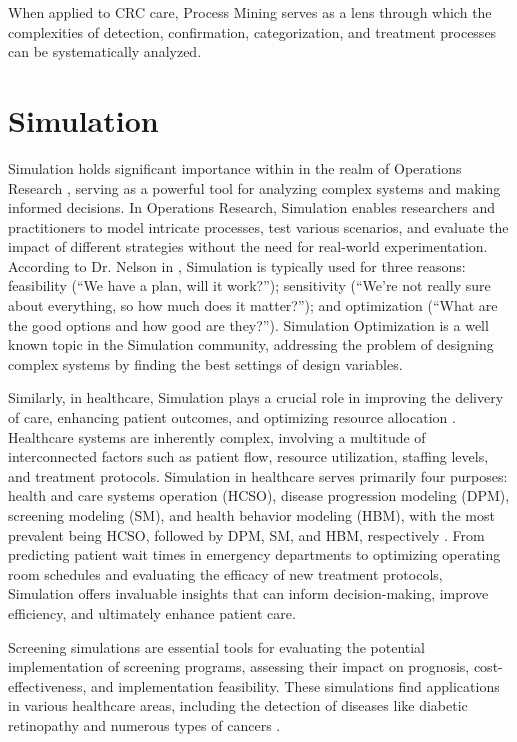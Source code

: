 When applied to CRC care, Process Mining serves as a lens through which the complexities of detection, confirmation, categorization, and treatment processes can be systematically analyzed.

\section{Simulation}

Simulation holds significant importance within in the realm of Operations Research \cite{de_paula_ferreira_simulation_2020}, serving as a powerful tool for analyzing complex systems and making informed decisions. In Operations Research, Simulation enables researchers and practitioners to model intricate processes, test various scenarios, and evaluate the impact of different strategies without the need for real-world experimentation. According to Dr. Nelson in \cite{fu_simulation_2014}, Simulation is typically used for three reasons: feasibility (“We have a plan, will it work?”); sensitivity (“We’re not really sure about everything, so how much does it matter?”); and optimization (“What are the good options and how good are they?”). Simulation Optimization is a well known topic in the Simulation community, addressing the problem of designing complex systems by finding the best settings of design variables.

Similarly, in healthcare, Simulation plays a crucial role in improving the delivery of care, enhancing patient outcomes, and optimizing resource allocation \cite{jun_application_1999}. Healthcare systems are inherently complex, involving a multitude of interconnected factors such as patient flow, resource utilization, staffing levels, and treatment protocols. Simulation in healthcare serves primarily four purposes: health and care systems operation (HCSO), disease progression modeling (DPM), screening modeling (SM), and health behavior modeling (HBM), with the most prevalent being HCSO, followed by DPM, SM, and HBM, respectively \cite{zhang_application_2018}. From predicting patient wait times in emergency departments to optimizing operating room schedules and evaluating the efficacy of new treatment protocols, Simulation offers invaluable insights that can inform decision-making, improve efficiency, and ultimately enhance patient care.

Screening simulations are essential tools for evaluating the potential implementation of screening programs, assessing their impact on prognosis, cost-effectiveness, and implementation feasibility. These simulations find applications in various healthcare areas, including the detection of diseases like diabetic retinopathy \cite{davies_evaluation_2002} and numerous types of cancers \cite{bespalov_cancer_2021}.

